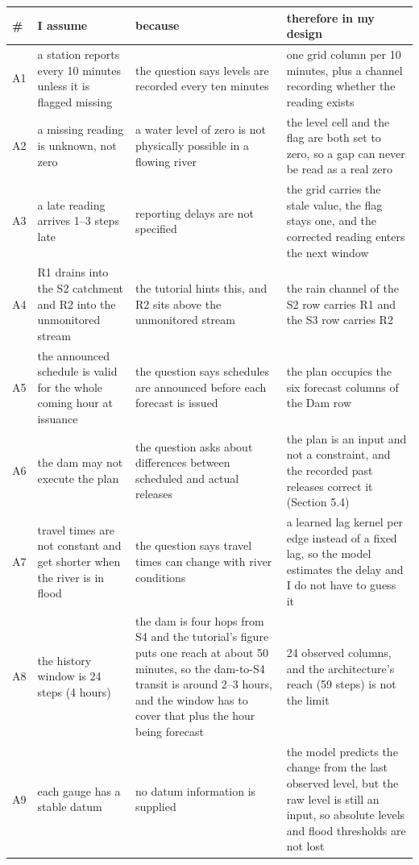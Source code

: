 \documentclass[11pt,letterpaper]{article}
\begin{document}
\begin{table}[H]
\centering
\small
\begin{tabularx}{\textwidth}{@{}p{0.2in}p{2.15in}p{2.15in}X@{}}
\toprule
\textbf{\#} & \textbf{I assume} & \textbf{because} & \textbf{therefore in my design} \\
\midrule
A1 & a station reports every 10 minutes unless it is flagged missing & the question says levels are recorded every ten minutes & one grid column per 10 minutes, plus a channel recording whether the reading exists \\
\hline
A2 & a missing reading is unknown, not zero & a water level of zero is not physically possible in a flowing river & the level cell and the flag are both set to zero, so a gap can never be read as a real zero \\
\hline
A3 & a late reading arrives 1--3 steps late & reporting delays are not specified & the grid carries the stale value, the flag stays one, and the corrected reading enters the next window \\
\hline
A4 & R1 drains into the S2 catchment and R2 into the unmonitored stream & the tutorial hints this, and R2 sits above the unmonitored stream & the rain channel of the S2 row carries R1 and the S3 row carries R2 \\
\hline
A5 & the announced schedule is valid for the whole coming hour at issuance & the question says schedules are announced before each forecast is issued & the plan occupies the six forecast columns of the Dam row \\
\hline
A6 & the dam may not execute the plan & the question asks about differences between scheduled and actual releases & the plan is an input and not a constraint, and the recorded past releases correct it (Section 5.4) \\
\hline
A7 & travel times are not constant and get shorter when the river is in flood & the question says travel times can change with river conditions & a learned lag kernel per edge instead of a fixed lag, so the model estimates the delay and I do not have to guess it \\
\hline
A8 & the history window is 24 steps (4 hours) & the dam is four hops from S4 and the tutorial's figure puts one reach at about 50 minutes, so the dam-to-S4 transit is around 2--3 hours, and the window has to cover that plus the hour being forecast & 24 observed columns, and the architecture's reach (59 steps) is not the limit \\
\hline
A9 & each gauge has a stable datum & no datum information is supplied & the model predicts the change from the last observed level, but the raw level is still an input, so absolute levels and flood thresholds are not lost \\

\end{tabularx}
\end{table}
\end{document}
